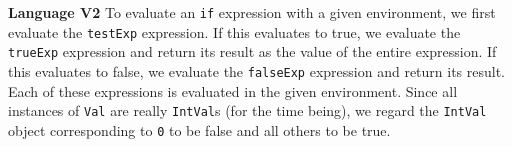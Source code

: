 \begin{minipage}[t]{\sw}
\slidenumber
\LARGE
{\bf Language V2}\exx
To evaluate an \verb'if' expression with a given environment,
we first evaluate the \verb'testExp' expression.
If this evaluates to true,
we evaluate the \verb'trueExp' expression
and return its result as the value of the entire expression.
If this evaluates to false,
we evaluate the \verb'falseExp' expression
and return its result.
Each of these expressions is evaluated
in the given environment.\exx
Since all instances of \verb'Val' are really \verb'IntVal's
(for the time being),
we regard the \verb'IntVal' object corresponding to \verb'0'
to be false and all others to be true.
\end{minipage}
